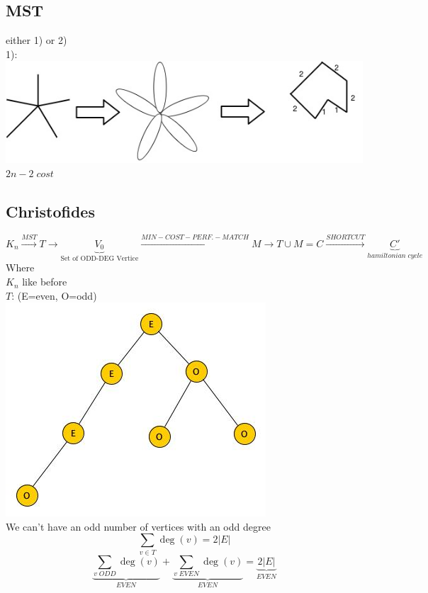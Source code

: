 \subsection{MST}
either 1) or 2) \\
1): \includegraphics[scale=0.5]{img/mst1} $2n-2 \; cost$
\subsection{Christofides}
$$K_n \stackrel{MST}{\rightarrow}T \rightarrow \underbrace{V_0}_{\text{Set of ODD-DEG Vertice}} \stackrel{MIN-COST-PERF.-MATCH}{\longrightarrow} M \rightarrow T \cup M = C \stackrel{SHORTCUT}{\rightarrow} \underbrace{C'}_{hamiltonian \; cycle}$$
Where \\
$K_n$ like before\\
$T$: (E=even, O=odd) \\
\includegraphics[scale=0.5]{img/graph19} \\
We can't have an odd number of vertices with an odd degree
$$\sum_{v \in T}\deg(v) = 2 |E|$$
$$\underbrace{\sum_{v \; ODD}\deg(v)}_{EVEN} + \underbrace{\sum_{v \; EVEN}\deg(v)}_{EVEN} = \underbrace{2 |E|}_{EVEN}$$
